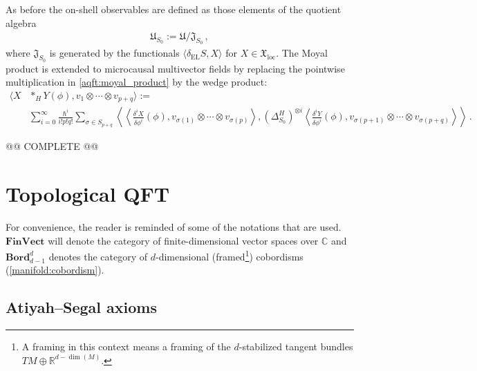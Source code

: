     As before the on-shell observables are defined as those elements of the quotient algebra
    \begin{gather}
        \mathfrak{U}_{S_0} := \mathfrak{U}/\mathfrak{J}_{S_0}\,,
    \end{gather}
    where $\mathfrak{J}_{S_0}$ is generated by the functionals $\langle\delta_{\text{EL}}S,X\rangle$ for $X\in\mathfrak{X}_{\text{loc}}$. The Moyal product is extended to microcausal multivector fields by replacing the pointwise multiplication in \cref{aqft:moyal_product} by the wedge product:
    \begin{align}
        \langle X\!&\ast_H\!Y(\phi),v_1\otimes\cdots\otimes v_{p+q} \rangle := \\
        &\sum_{i=0}^\infty\frac{\hbar^i}{i!p!q!}\sum_{\sigma\in S_{p+q}}\left\langle\!\!\left\langle\frac{\delta^iX}{\delta\phi^i}(\phi),v_{\sigma(1)}\otimes\cdots\otimes v_{\sigma(p)}\right\rangle,(\Delta^H_{S_0})^{\otimes i}\left\langle\frac{\delta^iY}{\delta\phi^i}(\phi),v_{\sigma(p+1)}\otimes\cdots\otimes v_{\sigma(p+q)}\right\rangle\!\!\right\rangle\,.\nonumber
    \end{align}

    @@ COMPLETE @@

\section{Topological QFT}

    For convenience, the reader is reminded of some of the notations that are used. $\mathbf{FinVect}$ will denote the category of finite-dimensional vector spaces over $\mathbb{C}$ and $\mathbf{Bord}^d_{d-1}$ denotes the category of $d$-dimensional (framed\footnote{A framing in this context means a framing of the $d$-stabilized tangent bundles $TM\oplus\mathbb{R}^{d-\dim(M)}$.}) cobordisms (\cref{manifold:cobordism}).

\subsection{Atiyah--Segal axioms}


